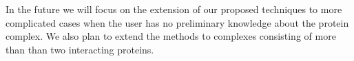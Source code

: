 \documentclass[journal]{vgtc}                %
\begin{document}
In the future we will focus on the extension of our proposed techniques to more complicated cases when the user has no preliminary knowledge about the protein complex.
We also plan to extend the methods to complexes consisting of more than than two interacting proteins. 


%

%
%
%

\end{document}
